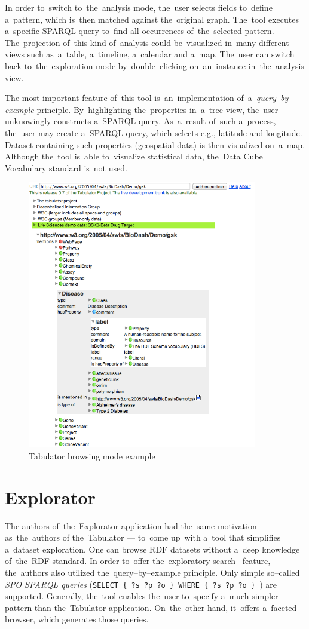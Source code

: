 In order to~switch to~the~analysis mode, the~user selects fields to~define a~pattern, which is~then matched against the~original graph. The~tool executes a~specific SPARQL query to~find all occurrences of~the~selected pattern. The~projection of~this kind of~analysis could be~visualized in~many different 
views such as~a~table, a~timeline, a~calendar and a~map. The~user can switch back to~the~exploration mode by~double--clicking on~an~instance in~the~analysis view.

The most important feature of~this tool is~an~implementation of~a~\emph{query--by--example} principle. By~highlighting the~properties in~a~tree view, the~user 
unknowingly constructs a~SPARQL query. As~a~result of~such a~process, the~user may create a~SPARQL query, which selects e.g., 
latitude and longitude. Dataset containing such properties (geospatial data)
is then visualized on~a~map. Although the~tool is~able to~visualize statistical 
data, the~Data Cube Vocabulary standard is~not used.


\begin{figure}
	\centering
	\includegraphics[width=100mm]{img/tabulator.png}
	\caption{Tabulator browsing mode example}
	\label{fig:tabulator}
\end{figure}


\section{Explorator}
\label{sec:rw:explorator}
The authors of~the~Explorator application had the~same motivation as~the~authors 
of the~Tabulator --- to~come up~with a~tool that simplifies a~dataset 
exploration. One can browse RDF datasets without a~deep knowledge of~the~RDF standard.
In order to~offer the~exploratory search~\cite{exploratory-search} feature, the~authors also
utilized the~query--by--example principle. Only simple so--called \emph{SPO SPARQL 
queries} (\texttt{SELECT \{ ?s ?p ?o \} WHERE \{ ?s ?p ?o \} }) are supported. Generally, the~tool 
enables the~user to~specify a~much simpler pattern than the~Tabulator 
application. On~the~other hand, it~offers a~faceted browser, which generates 
those queries.

